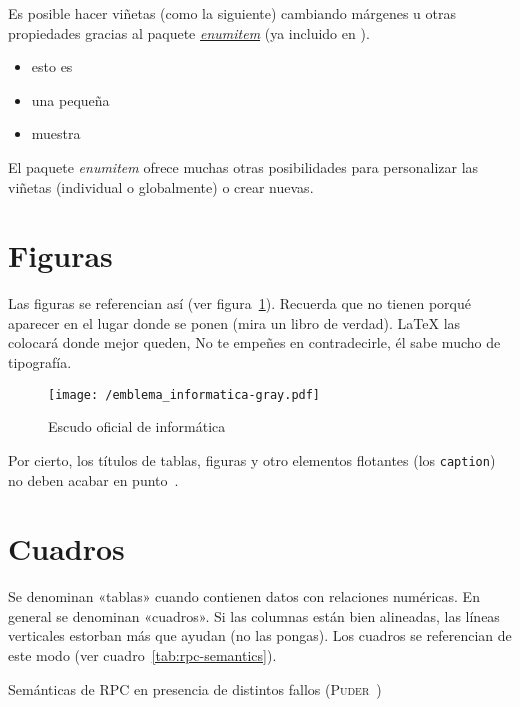 Es posible hacer viñetas (como la siguiente) cambiando márgenes u otras
propiedades gracias al paquete \href{http://mirror.ctan.org/macros/latex/contrib/enumitem/enumitem.pdf}{\emph{enumitem}}
(ya incluido en \arcopfc).

\begin{itemize}[noitemsep, label=$\triangleright$]
\item esto es
\item una pequeña
\item muestra
\end{itemize}

El paquete \emph{enumitem} ofrece muchas otras posibilidades para personalizar
las viñetas (individual o globalmente) o crear nuevas.


\section{Figuras}

Las figuras se referencian así (ver figura~\ref{fig:informatica}). Recuerda que
no tienen porqué aparecer en el lugar donde se ponen (mira un libro de
verdad). \LaTeX{} las colocará donde mejor queden, No te empeñes en
contradecirle, él sabe mucho de tipografía.

\begin{figure}[!h]
\begin{center}
\texttt{[image: /emblema\_informatica-gray.pdf]}
\caption{Escudo oficial de informática}
\label{fig:informatica}
\end{center}
\end{figure}

Por cierto, los títulos de tablas, figuras y otro elementos flotantes (los
\texttt{caption}) no deben acabar en punto~\cite{sousa}.


\section{Cuadros}
\label{sec:uncuadro}

Se denominan «tablas» cuando contienen datos con relaciones numéricas. En
general se denominan «cuadros». Si las columnas están bien alineadas, las líneas
verticales estorban más que ayudan (no las pongas). Los cuadros se referencian
de este modo (ver cuadro~\ref{tab:rpc-semantics}).

\begin{table}[hp]
  \centering
  {\small
  
  }
  \caption[Semánticas de \acs{RPC} en presencia de distintos fallos]
  {Semánticas de \acs{RPC} en presencia de distintos fallos
    (\textsc{Puder}~\cite{puder05:_distr_system_archit})}
  \label{tab:rpc-semantics}
\end{table}


